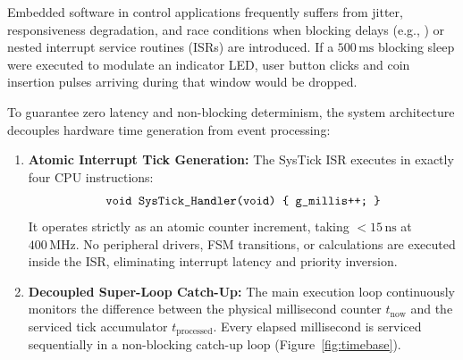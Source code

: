Embedded software in control applications frequently suffers from jitter, responsiveness degradation,
and race conditions when blocking delays (e.g., ) or nested interrupt service routines (ISRs)
are introduced. If a $500\,\text{ms}$ blocking sleep were executed to modulate an indicator LED, user button
clicks and coin insertion pulses arriving during that window would be dropped.

To guarantee zero latency and non-blocking determinism, the system architecture decouples hardware time
generation from event processing:
\begin{enumerate}
  \item \textbf{Atomic Interrupt Tick Generation:} The SysTick ISR executes in exactly four CPU instructions:
        \begin{equation}
          \text{\ttfamily void SysTick\_Handler(void) \{ g\_millis++; \}}
          \label{eq:systick-isr}
        \end{equation}
        It operates strictly as an atomic counter increment, taking $<15\,\text{ns}$ at $400\,\text{MHz}$.
        No peripheral drivers, FSM transitions, or calculations are executed inside the ISR, eliminating interrupt
        latency and priority inversion.
  \item \textbf{Decoupled Super-Loop Catch-Up:} The main execution loop continuously monitors the difference
        between the physical millisecond counter $t_{\text{now}}$ and the serviced tick accumulator $t_{\text{processed}}$.
        Every elapsed millisecond is serviced sequentially in a non-blocking catch-up loop (Figure~\ref{fig:timebase}).
\end{enumerate}

